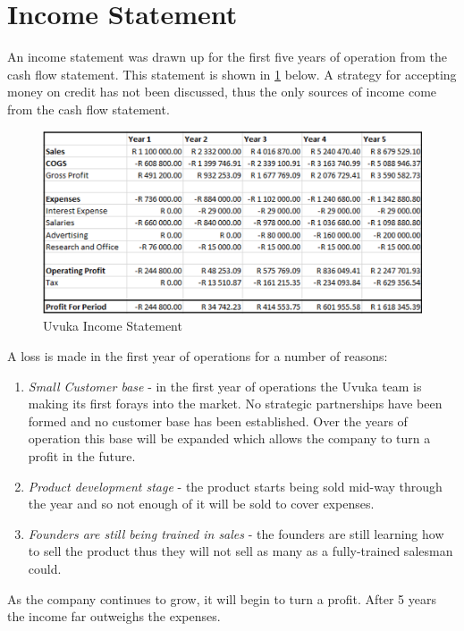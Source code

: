 \section{Income Statement}
An income statement was drawn up for the first five years of operation from the cash flow statement. This statement is shown in \cref{fig:IncomeStatement} below. A strategy for accepting money on credit has not been discussed, thus the only sources of income come from the cash flow statement. 

  \begin{figure}[H]
    \centering
    \includegraphics[width=1\textwidth]{images/IncomeStatement}
    \vskip10pt
    \caption[Uvuka Income Statement]{Uvuka Income Statement}
    \label{fig:IncomeStatement}
  \end{figure}

A loss is made in the first year of operations for a number of reasons:
  \begin{enumerate}
        \item \textit{Small Customer base} - in the first year of operations the Uvuka team is making its first forays into the market. No strategic partnerships have been formed and no customer base has been established. Over the years of operation this base will be expanded which allows the company to turn a profit in the future.
        \item \textit{Product development stage} - the product starts being sold mid-way through the year and so not enough of it will be sold to cover expenses.
        \item \textit{Founders are still being trained in sales} - the founders are still learning how to sell the product thus they will not sell as many as a fully-trained salesman could.
        \end{enumerate}
        
As the company continues to grow, it will begin to turn a profit. After 5 years the income far outweighs the expenses.

